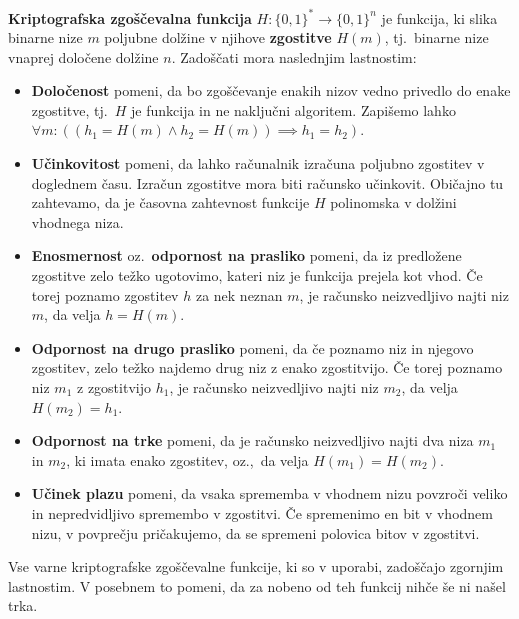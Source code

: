 \begin{definicija}
\label{def:hash}
    \textbf{Kriptografska zgoščevalna funkcija} $H: \{0, 1\}^* \rightarrow \{0, 1\}^n$ je funkcija, 
    ki slika binarne nize $m$ poljubne dolžine v njihove \textbf{zgostitve} $H(m)$, tj.\ binarne nize 
    vnaprej določene dolžine $n$. Zadoščati mora naslednjim lastnostim:
    \begin{itemize}
        \item \textbf{Določenost} pomeni, da bo zgoščevanje enakih nizov vedno privedlo do enake 
            zgostitve, tj.\ $H$ je funkcija in ne naključni algoritem. Zapišemo lahko
            $\forall m: ((h_1 = H(m) \wedge h_2 = H(m)) \implies h_1 = h_2)$.
        \item \textbf{Učinkovitost} pomeni, da lahko računalnik izračuna poljubno zgostitev v doglednem
            času. Izračun zgostitve mora biti računsko učinkovit. Običajno tu zahtevamo, da je časovna
            zahtevnost funkcije $H$ polinomska v dolžini vhodnega niza.
        \item \textbf{Enosmernost} oz.\ \textbf{odpornost na prasliko} pomeni, da iz predložene
            zgostitve zelo težko ugotovimo, kateri niz je funkcija prejela kot vhod. Če torej poznamo
            zgostitev $h$ za nek neznan $m$, je računsko neizvedljivo najti niz $m$, da velja $h = H(m)$.
        \item \textbf{Odpornost na drugo prasliko} pomeni, da če poznamo niz in njegovo zgostitev,
            zelo težko najdemo drug niz z enako zgostitvijo. Če torej poznamo niz $m_1$ z zgostitvijo
            $h_1$, je računsko neizvedljivo najti niz $m_2$, da velja $H(m_2) = h_1$.
        \item \textbf{Odpornost na trke} pomeni, da je računsko neizvedljivo najti dva niza $m_1$
            in $m_2$, ki imata enako zgostitev, oz.,\ da velja $H(m_1) = H(m_2)$.
        \item \textbf{Učinek plazu} pomeni, da vsaka sprememba v vhodnem nizu povzroči veliko in
            nepredvidljivo spremembo v zgostitvi. Če spremenimo en bit v vhodnem nizu, v povprečju
            pričakujemo, da se spremeni polovica bitov v zgostitvi.
    \end{itemize}
\end{definicija}

\begin{opomba}
    Vse varne kriptografske zgoščevalne funkcije, ki so v uporabi, zadoščajo zgornjim lastnostim. V
    posebnem to pomeni, da za nobeno od teh funkcij nihče še ni našel trka.
\end{opomba}

